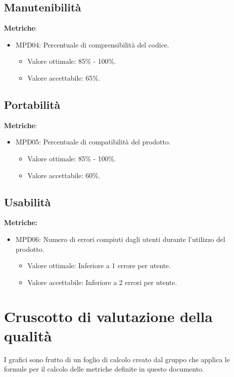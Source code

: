 \documentclass[12pt]{article}
\begin{document}
\subsection{Manutenibilità}
\textbf{Metriche}:
\begin{itemize}
	\item MPD04: Percentuale di comprensibilità del codice.
	      \begin{itemize}
		      \item Valore ottimale: 85\% - 100\%.
		      \item Valore accettabile: 65\%.
	      \end{itemize}
\end{itemize}

\subsection{Portabilità}
\textbf{Metriche}:
\begin{itemize}
	\item MPD05: Percentuale di compatibilità del prodotto.
	      \begin{itemize}
		      \item Valore ottimale: 85\% - 100\%.
		      \item Valore accettabile: 60\%.
	      \end{itemize}
\end{itemize}


\subsection{Usabilità}
\textbf{Metriche:}
\begin{itemize}
	\item MPD06: Numero di errori compiuti dagli utenti durante l'utilizzo del prodotto.
	      \begin{itemize}
		      \item Valore ottimale: Inferiore a 1 errore per utente.
		      \item Valore accettabile: Inferiore a 2 errori per utente.
	      \end{itemize}
\end{itemize}



\section {Cruscotto di valutazione della qualità}
I grafici sono frutto di un foglio di calcolo creato dal gruppo che applica le formule per il calcolo delle metriche definite in questo documento.
\end{document}

